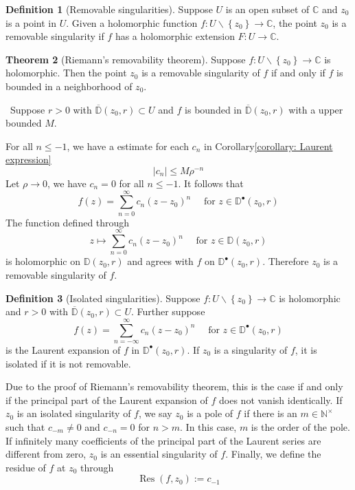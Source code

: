 \documentclass[12pt,a4paper]{book}
\newenvironment{prooff}{{\noindent\it\textcolor{cyan!40!black}{Proof}:}\,}{\par}
\theoremstyle{definition}
\newtheorem{defn}{Definition}[section]
\newtheorem{theo}[defn]{Theorem}
\begin{document}
\begin{defn}[Removable singularities]
    Suppose
$U$ is an open subset of $\mathbb{C}$ and $z_0$ is a point in $U$.
Given a holomorphic function $f: U \backslash\left\{z_0\right\} \rightarrow \mathbb{C}$, the point $z_0$ is a removable singularity if $f$ has a holomorphic extension $F: U \rightarrow \mathbb{C}$.
\end{defn}
\begin{theo}[Riemann's removability theorem]
    Suppose $f: U \backslash\left\{z_0\right\} \rightarrow \mathbb{C}$ is holomorphic. Then the point $z_0$ is a removable singularity of $f$ if and only if $f$ is bounded in a neighborhood of $z_0$.
\end{theo}
\begin{prooff}
    Suppose $r>0$ with $\overline{\mathbb{D}}\left(z_0, r\right) \subset U$ and 
    $f$ is bounded in $\overline{\mathbb{D}}\left(z_0, r\right)$ with a upper bounded $M$. 
    
    For all $n\le -1$, we have a estimate for each $c_n$ in Corollary\ref{corollary: Laurent expression} 
    \begin{equation*}
        |c_n|\le M \rho^{-n}
    \end{equation*}   
    Let $\rho\to 0$, we have $c_n=0$ for all $n\le -1$. 
    It follows that
$$
f(z)=\sum_{n=0}^{\infty} c_n\left(z-z_0\right)^n \quad \text { for } z \in \mathbb{D}^{\bullet}\left(z_0, r\right)
$$
The function defined through
$$
z \mapsto \sum_{n=0}^{\infty} c_n\left(z-z_0\right)^n \quad \text { for } z \in \mathbb{D}\left(z_0, r\right)
$$
is holomorphic on $\mathbb{D}\left(z_0, r\right)$ and agrees with $f$ on $\mathbb{D}^{\bullet}\left(z_0, r\right)$. Therefore $z_0$ is a removable singularity of $f$.
\end{prooff}
\begin{defn}[Isolated singularities]
    Suppose $f: U \backslash\left\{z_0\right\} \rightarrow \mathbb{C}$ is holomorphic and $r>0$ with $\overline{\mathbb{D}}\left(z_0, r\right) \subset U$. Further suppose
    $$
    f(z)=\sum_{n=-\infty}^{\infty} c_n\left(z-z_0\right)^n \quad \text { for } z \in \mathbb{D}^{\bullet}\left(z_0, r\right)
    $$
    is the Laurent expansion of $f$ in $\mathbb{D}^{\bullet}\left(z_0, r\right)$. If $z_0$ is a singularity of $f$, it is isolated if it is not removable. 
    
    Due to the proof of Riemann's removability theorem, this is the case if and only if the principal part of the Laurent expansion of $f$ does not vanish identically. If $z_0$ is an isolated singularity of $f$, we say $z_0$ is a pole of $f$ if there is an $m \in \mathbb{N}^{\times}$
    such that $c_{-m} \neq 0$ and $c_{-n}=0$ for $n>m$. In this case, $m$ is the order of the pole. If infinitely many coefficients of the principal part of the Laurent series are different from zero, $z_0$ is an essential singularity of $f$. Finally, we define the residue of $f$ at $z_0$ through
    $$
    \operatorname{Res}\left(f, z_0\right):=c_{-1}
    $$
\end{defn}
\end{document}
